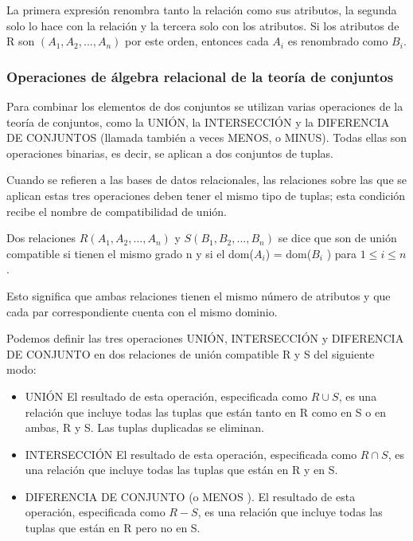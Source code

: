 La primera expresión renombra tanto la relación como sus atributos, la segunda solo lo hace con la relación y la tercera solo con los atributos. Si los atributos de R son $(A_1, A_2,...,A_n)$ por este orden, entonces cada $A_i$ es renombrado como $B_i$. 
\subsubsection{Operaciones de álgebra relacional de la teoría de conjuntos}

Para combinar los elementos de dos conjuntos se utilizan varias operaciones de la teoría de conjuntos, como la UNIÓN, la INTERSECCIÓN y la DIFERENCIA DE CONJUNTOS (llamada también a veces MENOS, o MINUS). Todas ellas son operaciones binarias, es decir, se aplican a dos conjuntos de tuplas.


Cuando se refieren a las bases de datos relacionales, las relaciones sobre las que se aplican estas tres operaciones deben tener el mismo tipo de tuplas; esta condición recibe el nombre de compatibilidad de unión. 


Dos relaciones $R(A_1, A_2,...,A_n)$ y $S(B_1,B_2,...,B_n)$ se dice que son de unión compatible si tienen el mismo grado n y si el dom($A_i$) = dom($B_i$ ) para $1 \leq i \leq n$. 


Esto significa que ambas relaciones tienen el mismo número de atributos y que cada par correspondiente cuenta con el mismo dominio.


Podemos definir las tres operaciones UNIÓN, INTERSECCIÓN y DIFERENCIA DE CONJUNTO en dos relaciones de unión compatible R y S del siguiente modo:

\begin{itemize}
    \item UNIÓN El resultado de esta operación, especificada como $R \cup S$, es una relación que incluye todas las tuplas que están tanto en R como en S o en ambas, R y S. Las tuplas duplicadas se eliminan.

    \item INTERSECCIÓN El resultado de esta operación, especificada como $R \cap S$, es una relación que incluye todas las tuplas que están en R y en S.
    
    \item  DIFERENCIA DE CONJUNTO (o MENOS ). El resultado de esta operación, especificada como $R - S$, es una relación que incluye todas las tuplas que están en R pero no en S.
\end{itemize}

